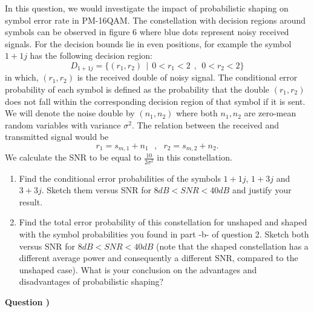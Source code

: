 \documentclass[10pt,letterpaper]{article}
\newcounter{QuestionNumber}
\newcommand{\Q}{
\textbf{Question \theQuestionNumber)}
\stepcounter{QuestionNumber}
}
\begin{document}
In this question, we would investigate the impact of probabilistic shaping on symbol error rate in PM-16QAM. The constellation with decision regions around symbols can be observed in figure 6 where blue dots represent noisy received signals. For the decision bounds lie in even positions, for example the symbol $1+1j$ has the following decision region:
$$
D_{1+1j}=\{(r_1,r_2)\ \ |\ \ 0<r_1<2\ \ ,\ \ 0<r_2<2\}
$$
in which, $(r_1,r_2)$ is the received double of noisy signal. The conditional error probability of each symbol is defined as the probability that the double $(r_1,r_2)$ does not fall within the corresponding decision region of that symbol if it is sent. We will denote the noise double by $(n_1,n_2)$ where both $n_1,n_2$ are zero-mean random variables with variance $\sigma^2$. The relation between the received and transmitted signal would be
$$
r_1=s_{m,1}+n_1\ \ \ ,\ \ \ 
r_2=s_{m,2}+n_2.
$$
We calculate the SNR to be equal to $\frac{10}{2\sigma^2}$ in this constellation.
\begin{enumerate}[label=\alph*-]
\item
Find the conditional error probabilities of the symbols $1+1j$, $1+3j$ and $3+3j$. Sketch them versus SNR for $8dB<SNR<40dB$ and justify your result.
\item
Find the total error probability of this constellation for unshaped and shaped with the symbol probabilities you found in part -b- of question 2. Sketch both versus SNR for $8dB<SNR<40dB$ (note that the shaped constellation has a different average power and consequently a different SNR, compared to the unshaped case). What is your conclusion on the advantages and disadvantages of probabilistic shaping?
\end{enumerate}



\Q
\end{document}
